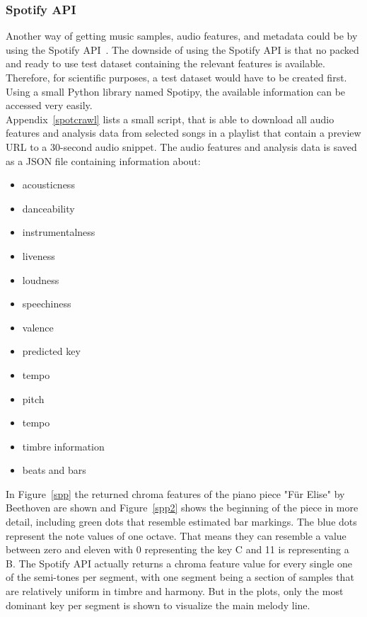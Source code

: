 \subsubsection{Spotify API}\label{spotipy}

Another way of getting music samples, audio features, and metadata could be by using the Spotify API~\cite{spotifyapi1}.
The downside of using the Spotify API is that no packed and ready to use test dataset containing the relevant features is available. Therefore, for scientific purposes, a test dataset would have to be created first. Using a small Python library named Spotipy, the available information can be accessed very easily.~\cite{spotipy1}\\
Appendix~\ref{spotcrawl} lists a small script, that is able to download all audio features and analysis data from selected songs in a playlist that contain a preview URL to a 30-second audio snippet. The audio features and analysis data is saved as a JSON file containing information about:
\begin{itemize}
	\setlength\itemsep{-0.5em}
	\item acousticness
	\item danceability
	\item instrumentalness
	\item liveness
	\item loudness
	\item speechiness
	\item valence
	\item predicted key
	\item tempo 
	\item pitch 
	\item tempo 
	\item timbre information 
	\item beats and bars 
\end{itemize}
\noindent In Figure~\ref{spp} the returned chroma features of the piano piece "Für Elise" by Beethoven are shown and Figure~\ref{spp2} shows the beginning of the piece in more detail, including green dots that resemble estimated bar markings. The blue dots represent the note values of one octave. That means they can resemble a value between zero and eleven with 0 representing the key C and 11 is representing a B. The Spotify API actually returns a chroma feature value for every single one of the semi-tones per segment, with one segment being a section of samples that are relatively uniform in timbre and harmony. But in the plots, only the most dominant key per segment is shown to visualize the main melody line.
